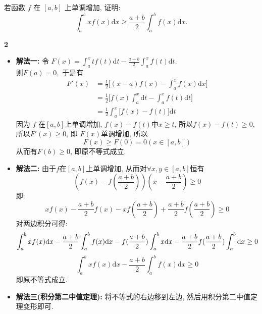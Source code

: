 \documentclass[12pt]{article}
\newenvironment{solution}[2][Solution]{\begin{trivlist}
\item[\hskip \labelsep {\bfseries #1}]}{\end{trivlist}}
\newenvironment{problem}[2][Problem]{\begin{trivlist}
\item[\hskip \labelsep {\bfseries #1}\hskip \labelsep {\bfseries #2.}]}{\end{trivlist}}
\begin{document}
\vspace{3cm}

\begin{problem}{2}
    若函数 $f$ 在 $\left[a, b\right]$ 上单调增加, 证明:
    \[
        \int_a^b xf(x) \mathrm{d} x \geq \frac{a+b}{2}\int_a^b f(x) \mathrm{d} x.
    \]
    
\end{problem}


\begin{solution}{2} \textbf{2}

    \begin{itemize}
        \item \textbf{解法一:} 令 $F(x) = \int_a^x tf(t)\mathrm{d}t - \frac{a+b}{2}\int_a^xf(t)\mathrm{d}t.$ \\
            则$F(a) = 0,$ 于是有\\
            \[
                \begin{aligned}
                    F'(x) &= \frac{1}{2} \Big[ (x-a)f(x) - \int_a^x f(x)\mathrm{d}x \Big] \\
                    &= \frac{1}{2}\Big[ f(x)\int_a^x \mathrm{d}t - \int_a^x f(t)\mathrm{d}t \Big] \\
                    &= \frac{1}{2}\int_a^x \Big[f(x) - f(t)\Big]\mathrm{d}t
                \end{aligned}
            \]
            因为 $f$ 在$\left[a, b\right]$上单调增加, $f(x) - f(t)中x\geq t$, 所以$f(x) - f(t)\geq 0$, 所以$F'(x)\geq 0$, 即 $F(x)$单调增加, 所以
            \[
                F(x)\geq F(0) = 0(x\in \left[a, b\right])
            \]
            从而有$F(b)\geq 0$, 即原不等式成立.
        
        \item \textbf{解法二:} 由于$f$在$\left[a, b\right]$上单调增加, 从而对$\forall x, y \in \left[a, b\right]$恒有
            \[
                (f(x) - f(\frac{a+b}{2}))(x - \frac{a+b}{2}) \geq 0   
            \]
            即:
            \[
                xf(x) - \frac{a+b}{2}f(x) - xf(\frac{a+b}{2}) + \frac{a+b}{2}f(\frac{a+b}{2}) \geq 0
            \]
            对两边积分可得:
            \[
                \int_a^b xf(x)\mathrm{d}x - \frac{a+b}{2}\int_a^b f(x)\mathrm{d}x - f(\frac{a+b}{2})\int_a^b x\mathrm{d}x - \frac{a+b}{2}f(\frac{a+b}{2})\int_a^b \mathrm{d}x \geq 0\\
            \]
            \[
                \int_a^b xf(x)\mathrm{d}x - \frac{a+b}{2}\int_a^b f(x)\mathrm{d}x \geq 0    
            \]
            即原不等式成立.
        
        \item \textbf{解法三(积分第二中值定理):} 将不等式的右边移到左边, 然后用积分第二中值定理变形即可.
    \end{itemize}
    
\end{solution}
\end{document}
